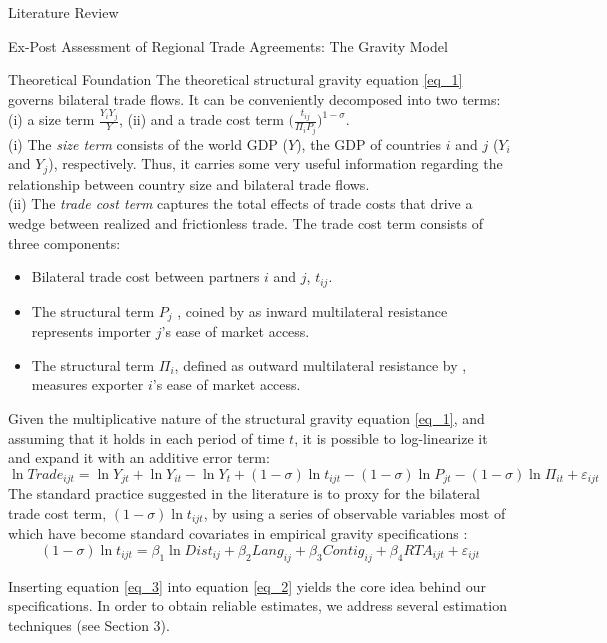 \begin{section}{Literature Review}
\begin{subsection}{Ex-Post Assessment of Regional Trade Agreements: The Gravity Model}
\begin{subsubsection}{Theoretical Foundation}
The theoretical structural gravity equation \ref{eq_1} governs bilateral trade flows. It can be conveniently decomposed into two terms: (i) a size term $\frac{Y_{i}Y_{j}}{Y}$, (ii) and a trade cost term $\Big(\frac{t_{ij}}{\Pi_{i}P_{j}}\Big)^{1-\sigma}$.
\bigskip
\\
(i) The \textit{size term} consists of the world GDP ($Y$), the GDP of countries $i$ and $j$ ($Y_{i}$ and $Y_{j}$), respectively. Thus, it carries some very useful information regarding the relationship between country size and bilateral trade flows.
\bigskip
\\
(ii) The \textit{trade cost term} captures the total effects of trade costs that drive a wedge between realized and frictionless trade. The trade cost term consists of three components:
\begin{itemize}
\item Bilateral trade cost between partners $i$ and $j$, $t_{ij}$.
\item The structural term $P_{j}$ , coined by \cite{avw2003} as inward multilateral resistance represents importer $j$’s ease of market access.
\item The structural term $\Pi_{i}$, defined as outward multilateral resistance by \cite{avw2003}, measures exporter $i$’s ease of market access.
\end{itemize}

Given the multiplicative nature of the structural gravity equation \ref{eq_1}, and assuming that it holds in each period of time $t$, it is possible to log-linearize it and expand it with an additive error term:
\begin{equation}\label{eq_2}
   \ln{Trade_{ijt}}=\ln{Y_{jt}}+ \ln{Y_{it}}-\ln{Y_{t}}+(1-\sigma)\ln{t_{ijt}}-(1-\sigma)\ln{P_{jt}}-(1-\sigma)\ln{\Pi_{it}}+\varepsilon_{ijt}
\end{equation}
The standard practice suggested in the literature is to proxy for the
bilateral trade cost term, $(1-\sigma)\ln{t_{ijt}}$, by using a series of observable variables most of which have become standard covariates in empirical gravity specifications \cite{ypl_2016}:
\begin{equation}\label{eq_3}
(1-\sigma)\ln{t_{ijt}}=\beta_{1}\ln{Dist_{ij}} + \beta_2 Lang_{ij} + \beta_3 Contig_{ij} + \beta_4RTA_{ijt}+\varepsilon_{ijt}
\end{equation}

Inserting equation \ref{eq_3} into equation \ref{eq_2} yields the core idea behind our specifications. In order to obtain reliable estimates, we address several estimation techniques (see Section 3). 



\end{subsubsection}
\end{subsection}
\end{section}
